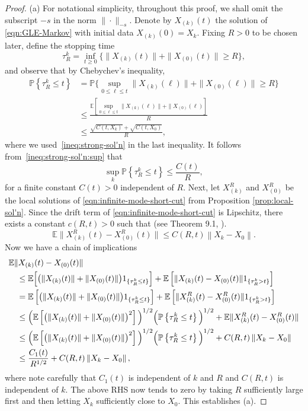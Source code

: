 \documentclass[11pt]{amsart}
\theoremstyle{definition}
\newcommand{\E}[1]{\mathbb{E}\left[#1\right]}
\newcommand{\Enone}[1]{\mathbb{E}#1}
\renewcommand{\P}[1]{\mathbb{P}\left\{#1\right\}}
\newcommand{\Pnone}{\mathbb{P}}
\theoremstyle{definition}
\theoremstyle{plain}
\numberwithin{equation}{section}
\begin{document}
\begin{proof} (a) For notational simplicity, throughout this proof, we shall omit the subscript $-s$ in the norm $\|\cdot\|_{-s}$. Denote by $X_{(k)}(t)$ the solution of \eqref{eqn:GLE-Markov} with initial data $X_{(k)}(0)=X_k$. Fixing $R>0$ to be chosen later, define the stopping time 
\begin{equation*}
\tau_R^k = \inf_{t\geq 0}\{\|X_{(k)}(t)\|+\|X_{(0)}(t)\|\geq R\},
\end{equation*}
and observe that by Chebychev's inequality,
\begin{align*}
\P{\tau_R^k\leq t}&=\Pnone\Big\{\sup_{0\leq \ell\leq t}\|X_{(k)}(\ell)\|+\|X_{(0)}(\ell)\|\geq R\Big\}\\
&\leq \frac{\E{\sup_{0\leq \ell\leq t} \|X_{(k)}(\ell)\|+\|X_{(0)}(\ell) }}{R}\\
&\leq \frac{\sqrt{C(t,X_k)}+\sqrt{C(t,X_0)}}{R},
\end{align*}
where we used~\eqref{ineq:strong-sol'n} in the last inequality. It follows from~\eqref{ineq:strong-sol'n:sup} that 
\begin{equation}\label{ineq:sol'n-2a}
\sup_{k}\P{\tau_R^k\leq t}\leq \frac{C(t)}{R},
\end{equation}
for a finite constant $C(t)>0$ independent of $R$. Next, let $X_{(k)}^R$ and $X_{(0)}^R$ be the local solutions of \eqref{eqn:infinite-mode-short-cut} from Proposition \ref{prop:local-sol'n}. Since the drift term of \eqref{eqn:infinite-mode-short-cut} is Lipschitz, there exists a constant $c(R,t)>0$ such that (see Theorem 9.1, \cite{da2014stochastic}).
\begin{equation}\label{ineq:sol'n-2}
\Enone\big\|X_{(k)}^R(t)-X_{(0)}^R(t)\big\|\leq C(R,t)\left\|X_k-X_0\right\|.
\end{equation}
Now we have a chain of implications
\begin{equation*}
\begin{aligned}
\MoveEqLeft[1]\Enone\|X_{(k)}(t)-X_{(0)}(t)\|\\
&\leq \Enone \Big[\big(\|X_{(k)}(t)\|+\|X_{(0)}(t)\|\big)1_{\{\tau_R^k\leq t\}}\Big]+\E{\|X_{(k)}(t)-X_{(0)}(t)\|1_{\{\tau_R^k> t\}}}\\
&=  \E{\big(\|X_{(k)}(t)\|+\|X_{(0)}(t)\|\big)1_{\{\tau_R^k\leq t\}}}+\E{\|X_{(k)}^R(t)-X_{(0)}^R(t)\|1_{\{\tau_R^k> t\}}}\\
&\leq \Big(\E{\big(\|X_{(k)}(t)\|+\|X_{(0)}(t)\|\big)^2 }\Big)^{1/2}\Big(\P{\tau_R^k\leq t}\Big)^{1/2}+ \Enone\|X_{(k)}^R(t)-X_{(0)}^R(t)\|\\
&\leq \Big(\E{\big(\|X_{(k)}(t)\|+\|X_{(0)}(t)\|\big)^2 }\Big)^{1/2}\Big(\P{\tau_R^k\leq t}\Big)^{1/2}+ C(R,t)\left\|X_k-X_0\right\|\\
&\leq \frac{C_1(t)}{R^{1/2}}+C(R,t)\left\|X_k-X_0\right\|,
\end{aligned}
\end{equation*}
where note carefully that $C_1(t)$ is independent of $k$ and $R$ and $C(R,t)$ is independent of $k$. The above RHS now tends to zero by taking $R$ sufficiently large first and then letting $X_k$ sufficiently close to $X_0$. This establishes (a).




\end{proof}
\end{document}
